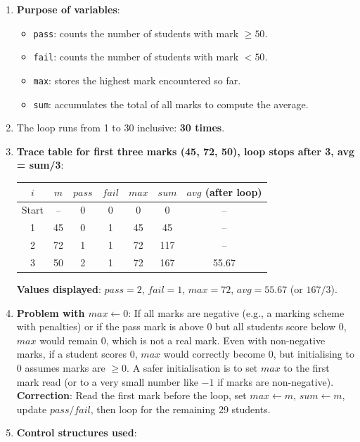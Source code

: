 \documentclass[11pt]{article}
\begin{document}
\begin{corrige}
\begin{enumerate}
\item \textbf{Purpose of variables}:
\begin{itemize}
\item \texttt{pass}: counts the number of students with mark $\geq 50$.
\item \texttt{fail}: counts the number of students with mark $< 50$.
\item \texttt{max}: stores the highest mark encountered so far.
\item \texttt{sum}: accumulates the total of all marks to compute the average.
\end{itemize}
\item The loop runs from 1 to 30 inclusive: \textbf{30 times}.
\item \textbf{Trace table for first three marks (45, 72, 50), loop stops after 3, avg = sum/3}:
\begin{center}
\begin{tabular}{|c|c|c|c|c|c|c|}
\hline
$i$ & $m$ & $pass$ & $fail$ & $max$ & $sum$ & $avg$ (after loop) \\
\hline
Start & – & 0 & 0 & 0 & 0 & – \\
1 & 45 & 0 & 1 & 45 & 45 & – \\
2 & 72 & 1 & 1 & 72 & 117 & – \\
3 & 50 & 2 & 1 & 72 & 167 & 55.67 \\
\hline
\end{tabular}
\end{center}
\textbf{Values displayed}: $pass = 2$, $fail = 1$, $max = 72$, $avg = 55.67$ (or $167/3$).
\item \textbf{Problem with $max \leftarrow 0$}: If all marks are negative (e.g., a marking scheme with penalties) or if the pass mark is above 0 but all students score below 0, $max$ would remain 0, which is not a real mark. Even with non-negative marks, if a student scores 0, $max$ would correctly become 0, but initialising to 0 assumes marks are $\geq 0$. A safer initialisation is to set $max$ to the first mark read (or to a very small number like $-1$ if marks are non-negative).  
\textbf{Correction}: Read the first mark before the loop, set $max \leftarrow m$, $sum \leftarrow m$, update $pass/fail$, then loop for the remaining 29 students.
\item \textbf{Control structures used}:
\begin{itemize}

\end{itemize}
\end{enumerate}
\end{corrige}
\end{document}
